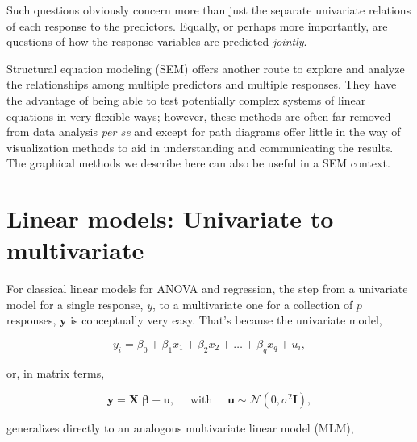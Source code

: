 \documentclass[
  letterpaper,
  10pt,
  krantz2]{krantz}
\begin{document}
Such questions obviously concern more than just the separate univariate
relations of each response to the predictors. Equally, or perhaps more
importantly, are questions of how the response variables are predicted
\emph{jointly}.

\begin{tcolorbox}[enhanced jigsaw, arc=.35mm, opacitybacktitle=0.6, colback=white, bottomtitle=1mm, colbacktitle=quarto-callout-note-color!10!white, leftrule=.75mm, coltitle=black, titlerule=0mm, opacityback=0, toptitle=1mm, colframe=quarto-callout-note-color-frame, toprule=.15mm, left=2mm, breakable, rightrule=.15mm, title=\textcolor{quarto-callout-note-color}{\faInfo}\hspace{0.5em}{SEM}, bottomrule=.15mm]

Structural equation modeling (SEM) offers another route to explore and
analyze the relationships among multiple predictors and multiple
responses. They have the advantage of being able to test potentially
complex systems of linear equations in very flexible ways; however,
these methods are often far removed from data analysis \emph{per se} and
except for path diagrams offer little in the way of visualization
methods to aid in understanding and communicating the results. The
graphical methods we describe here can also be useful in a SEM context.

\end{tcolorbox}

\hypertarget{linear-models-univariate-to-multivariate}{%
\section{Linear models: Univariate to
multivariate}\label{linear-models-univariate-to-multivariate}}

For classical linear models for ANOVA and regression, the step from a
univariate model for a single response, \(y\), to a multivariate one for
a collection of \(p\) responses, \(\mathbf{y}\) is conceptually very
easy. That's because the univariate model,

\[y_i = \beta_0 + \beta_1 x_1 + \beta_2 x_2 + \dots + \beta_q x_q + u_i , \]

or, in matrix terms,

\[\mathbf{y} = \mathbf{X} \; \mathbf{\beta} + \mathbf{u}, \quad\mbox{   with   }\quad \mathbf{u} \sim \mathcal{N} (0, \sigma^2 \mathbf{I}) ,\]

generalizes directly to an analogous multivariate linear model (MLM),
\end{document}
